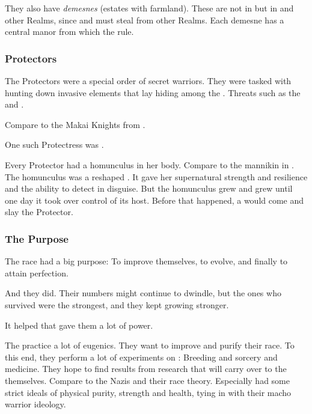 They also have \emph{demesnes} (estates with farmland). 
These are not in \Nyx{} but in  and other  Realms, since  and must steal from other Realms. 
Each demesne has a central manor from which the \resphain{} rule. 





\subsubsection{Protectors}
The \resphan Protectors were a special order of secret warriors.
They were tasked with hunting down invasive elements that lay hiding among the \resphain.
Threats such as the  and .

Compare to the Makai Knights from \cite{TV:Garo}. 

One such Protectress was . 

Every Protector had a homunculus in her body. 
Compare to the mannikin in \cite{RobertBloch:TheMannikin}.
The homunculus was a reshaped .
It gave her supernatural strength and resilience and the ability to detect \mothlain in disguise.
But the homunculus grew and grew until one day it took over control of its host. 
Before that happened, a  would come and slay the Protector.





\subsubsection{The Purpose}
The \resphan{} race had a big purpose: 
To improve themselves, to evolve, and finally to attain perfection. 

And they did. 
Their numbers might continue to dwindle, but the ones who survived were the strongest, and they kept growing stronger. 

It helped that \iquin{} gave them a lot of power. 

The \resphain practice a lot of eugenics.
They want to improve and purify their race. 
To this end, they perform a lot of experiments on \humans:
Breeding and sorcery and medicine. 
They hope to find results from \human research that will carry over to the \resphain themselves. 
Compare to the Nazis and their race theory. 
Especially \Mystraacht had some strict ideals of physical purity, strength and health, tying in with their macho warrior ideology.

